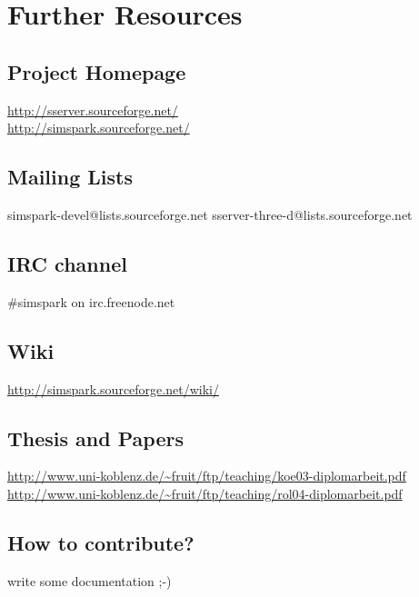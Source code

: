 \chapter{Further Resources}


\section{Project Homepage}

\url{http://sserver.sourceforge.net/}\\
\url{http://simspark.sourceforge.net/}

\section{Mailing Lists}

simspark-devel@lists.sourceforge.net
sserver-three-d@lists.sourceforge.net

\section{IRC channel}

\#simspark on irc.freenode.net

\section{Wiki}

\url{http://simspark.sourceforge.net/wiki/}

\section{Thesis and Papers}

\url{http://www.uni-koblenz.de/~fruit/ftp/teaching/koe03-diplomarbeit.pdf}\\
\url{http://www.uni-koblenz.de/~fruit/ftp/teaching/rol04-diplomarbeit.pdf}

\section{How to contribute?}

write some documentation ;-)

